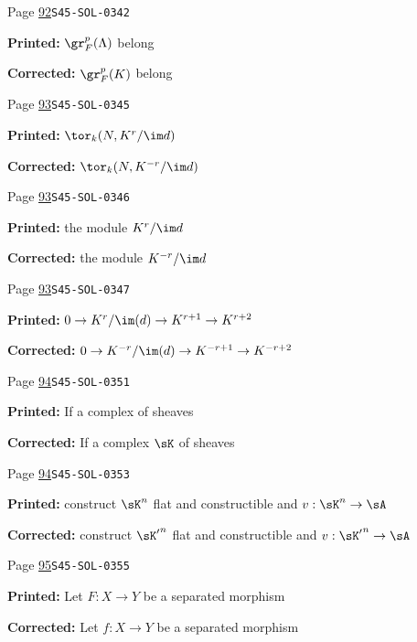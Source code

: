 \begin{description}
\smallskip
\item[\hypertarget{apparatus:EN-0029}{29}] Page \hyperlink{printpage:en:92}{92}\quad\texttt{S45-SOL-0342}
\par\noindent\textbf{Printed:} $\gr_F^p(\Lambda)$ belong
\par\noindent\textbf{Corrected:} $\gr_F^p(K)$ belong
\smallskip
\item[\hypertarget{apparatus:EN-0030}{30}] Page \hyperlink{printpage:en:93}{93}\quad\texttt{S45-SOL-0345}
\par\noindent\textbf{Printed:} \(\tor_k(N,K^r/\im d)\)
\par\noindent\textbf{Corrected:} \(\tor_k(N,K^{-r}/\im d)\)
\smallskip
\item[\hypertarget{apparatus:EN-0031}{31}] Page \hyperlink{printpage:en:93}{93}\quad\texttt{S45-SOL-0346}
\par\noindent\textbf{Printed:} the module $K^r/\im d$
\par\noindent\textbf{Corrected:} the module $K^{-r}/\im d$
\smallskip
\item[\hypertarget{apparatus:EN-0032}{32}] Page \hyperlink{printpage:en:93}{93}\quad\texttt{S45-SOL-0347}
\par\noindent\textbf{Printed:} \(0 \to K^r/\im(d) \to K^{r+1} \to K^{r+2}\)
\par\noindent\textbf{Corrected:} \(0 \to K^{-r}/\im(d) \to K^{-r+1} \to K^{-r+2}\)
\smallskip
\item[\hypertarget{apparatus:EN-0033}{33}] Page \hyperlink{printpage:en:94}{94}\quad\texttt{S45-SOL-0351}
\par\noindent\textbf{Printed:} If a complex of sheaves
\par\noindent\textbf{Corrected:} If a complex $\sK$ of sheaves
\smallskip
\item[\hypertarget{apparatus:EN-0034}{34}] Page \hyperlink{printpage:en:94}{94}\quad\texttt{S45-SOL-0353}
\par\noindent\textbf{Printed:} construct $\sK^n$ flat and constructible and $v:\sK^n\to \sA$
\par\noindent\textbf{Corrected:} construct ${\sK'}^n$ flat and constructible and $v:{\sK'}^n\to \sA$
\smallskip
\item[\hypertarget{apparatus:EN-0035}{35}] Page \hyperlink{printpage:en:95}{95}\quad\texttt{S45-SOL-0355}
\par\noindent\textbf{Printed:} Let $F:X\to Y$ be a separated morphism
\par\noindent\textbf{Corrected:} Let $f:X\to Y$ be a separated morphism

\end{description}
